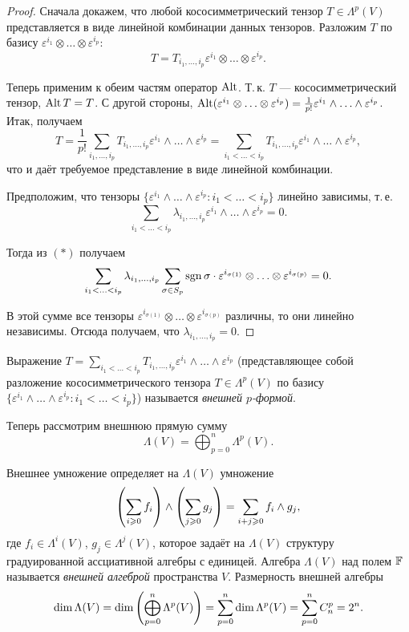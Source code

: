 \begin{proof}
    Сначала докажем, что любой кососимметрический тензор $T \in \Lambda^p(V)$ представляется в виде линейной комбинации данных тензоров. Разложим $T$ по базису $\varepsilon^{i_1} \otimes \ldots \otimes \varepsilon^{i_p}$:
    \[
        T = T_{i_1, \ldots, i_p}\varepsilon^{i_1} \otimes \ldots \otimes \varepsilon^{i_p}.
    \]

    Теперь применим к обеим частям оператор $\operatorname{Alt}$. Т.\,к. $T$ --- кососимметрический тензор, $\operatorname{Alt} T = T$. С другой стороны, $\operatorname{Alt}(\varepsilon^{i_1} \otimes \ldots \otimes \varepsilon^{i_p}) = \frac{1}{p!}\varepsilon^{i_1} \wedge \ldots \wedge \varepsilon^{i_p}$. Итак, получаем
    \[
        T = \frac{1}{p!}\sum_{i_1, \ldots, i_p}T_{i_1, \ldots, i_p}\varepsilon^{i_1}\wedge \ldots \wedge \varepsilon^{i_p} = \sum_{i_1 < \ldots < i_p}T_{i_1, \ldots, i_p}\varepsilon^{i_1} \wedge \ldots \wedge \varepsilon^{i_p},
    \]
    что и даёт требуемое представление в виде линейной комбинации.

    Предположим, что тензоры $\{\varepsilon^{i_1} \wedge \ldots \wedge \varepsilon^{i_p} : i_1 < \ldots < i_p\}$ линейно зависимы, т.\,е.
    \[
        \sum_{i_1 < \ldots < i_p}\lambda_{i_1, \ldots, i_p}\varepsilon^{i_1} \wedge \ldots \wedge \varepsilon^{i_p} = 0.
    \]

    Тогда из $(\ast)$ получаем
    \[
        \sum_{i_1 < \ldots < i_p}\lambda_{i_1, \ldots, i_p}\sum_{\sigma \in S_p}\operatorname{sgn}\sigma \cdot \varepsilon^{i_{\sigma(1)}} \otimes \ldots \otimes \varepsilon^{i_{\sigma(p)}} = 0.
    \]

    В этой сумме все тензоры $\varepsilon^{i_{\sigma(1)}} \otimes \ldots \otimes \varepsilon^{i_{\sigma(p)}}$ различны, то они линейно независимы. Отсюда получаем, что $\lambda_{i_1, \ldots, i_p} = 0$.
\end{proof}

\begin{definition}
    Выражение $T = \sum\limits_{i_1 < \ldots < i_p}T_{i_1, \ldots, i_p}\varepsilon^{i_1} \wedge \ldots \wedge \varepsilon^{i_p}$ (представляющее собой разложение кососимметрического тензора $T \in \Lambda^p(V)$ по базису $\{\varepsilon^{i_1} \wedge \ldots \wedge \varepsilon^{i_p} : i_1 < \ldots < i_p\}$) называется \textit{внешней $p$-формой}.
\end{definition}

Теперь рассмотрим внешнюю прямую сумму
\[
    \Lambda(V) = \bigoplus_{p = 0}^n\Lambda^p(V).
\]

Внешнее умножение определяет на $\Lambda(V)$ умножение
\[
    \left(\sum_{i \geqslant 0}f_i\right) \wedge \left(\sum_{j \geqslant 0}g_j\right) = \sum_{i + j \geqslant 0}f_i \wedge g_j,
\]
где $f_i \in \Lambda^i(V)$, $g_j \in \Lambda^j(V)$, которое задаёт на $\Lambda(V)$ структуру градуированной ассциативной алгебры с единицей. Алгебра $\Lambda(V)$ над полем $\mathbb{F}$ называется \textit{внешней алгеброй} пространства $V$. Размерность внешней алгебры
\[
    \dim\Lambda(V) = \dim\left(\bigoplus_{p = 0}^n\Lambda^p(V)\right) = \sum_{p = 0}^n\dim\Lambda^p(V) = \sum_{p = 0}^nC_n^p = 2^n.
\]

